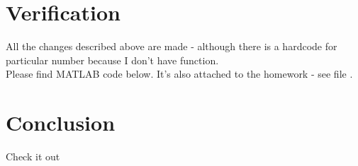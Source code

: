 \documentclass[14pt, letterpaper]{article}
\begin{document}
\section{Verification}
All the changes described above are made - although there is a hardcode for particular number because I don't have  function.\\
Please find MATLAB code below. It's also attached to the homework - see file .


\section{Conclusion}
Check it out
\end{document}
